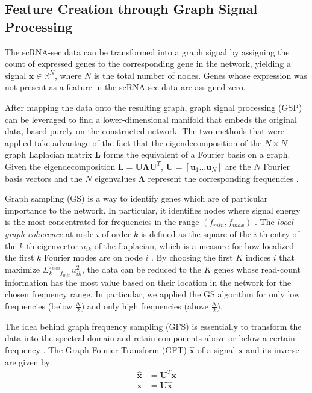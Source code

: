 \documentclass[10pt,conference,compsocconf]{IEEEtran}
\begin{document}
\subsection{Feature Creation through Graph Signal Processing}
The scRNA-sec data can be transformed into a graph signal by assigning the count of expressed genes to the corresponding gene in the network, yielding a signal $\boldsymbol{x} \in \mathbb{R}^N$, where $N$ is the total number of nodes. Genes whose expression was not present as a feature in the scRNA-sec data are assigned zero. 
\par
After mapping the data onto the resulting graph, graph signal processing (GSP) can be leveraged to find a lower-dimensional manifold that embeds the original data, based purely on the constructed network. The two methods that were applied take advantage of the fact that the eigendecomposition of the $N \times N$ graph Laplacian matrix $\boldsymbol{L}$ forms the equivalent of a Fourier basis on a graph. Given the eigendecomposition $\boldsymbol{L} = \boldsymbol{U\Lambda U}^T$, $\boldsymbol{U} = [ \boldsymbol{u}_1 ... \boldsymbol{u}_N]$ are the $N$ Fourier basis vectors and the $N$ eigenvalues $\boldsymbol{\Lambda}$ represent the corresponding frequencies \cite{Puy2018}.
\par
Graph sampling (GS) is a way to identify genes which are of particular importance to the network. In particular, it identifies nodes where signal energy is the most concentrated for frequencies in the range $(f_{min}, f_{max})$ \cite{Menoret2017}. The \textit{local graph coherence} at node $i$ of order $k$ is defined as the square of the $i$-th entry of the $k$-th eigenvector $u_{ik}$ of the Laplacian, which is a measure for how localized the first $k$ Fourier modes are on node $i$ \cite{Puy2018}. By choosing the first $K$ indices $i$ that maximize $\Sigma_{k=f_{min}}^{f_{max}} u_{ik}^2$, the data can be reduced to the $K$ genes whose read-count information has the most value based on their location in the network for the chosen frequency range. In particular, we applied the GS algorithm for only low frequencies (below $\frac{N}{2}$) and only high frequencies (above $\frac{N}{2}$). 
\par
The idea behind graph frequency sampling (GFS) is essentially to transform the data into the spectral domain and retain components above or below a certain frequency \cite{Rui2016}. The Graph Fourier Transform (GFT) $\boldsymbol{\hat{x}}$ of a signal $\boldsymbol{x}$ and its inverse are given by
\begin{align}\label{equ:GFT}
\boldsymbol{\hat{x}} &= \boldsymbol{U}^T \boldsymbol{x}\\ \label{equ:iGFT}
\boldsymbol{x} &= \boldsymbol{U} \boldsymbol{\hat{x}}
\end{align} 
\end{document}
